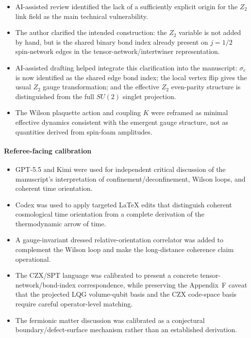 \documentclass[preprint]{SciPost}
\theoremstyle{plain} %
\begin{document}
\begin{itemize}
\item AI-assisted review identified the lack of a sufficiently explicit origin for the $Z_2$ link field as the main technical vulnerability.
\item The author clarified the intended construction: the $Z_2$ variable is not added by hand, but is the shared binary bond index already present on $j=1/2$ spin-network edges in the tensor-network/intertwiner representation.
\item AI-assisted drafting helped integrate this clarification into the manuscript: $\sigma_e$ is now identified as the shared edge bond index; the local vertex flip gives the usual $Z_2$ gauge transformation; and the effective $Z_2$ even-parity structure is distinguished from the full $SU(2)$ singlet projection.
\item The Wilson plaquette action and coupling $K$ were reframed as minimal effective dynamics consistent with the emergent gauge structure, not as quantities derived from spin-foam amplitudes.
\end{itemize}

\paragraph{Referee-facing calibration}

\begin{itemize}
\item GPT-5.5 and Kimi were used for independent critical discussion of the manuscript's interpretation of confinement/deconfinement, Wilson loops, and coherent time orientation.
\item Codex was used to apply targeted \LaTeX{} edits that distinguish coherent cosmological time orientation from a complete derivation of the thermodynamic arrow of time.
\item A gauge-invariant dressed relative-orientation correlator was added to complement the Wilson loop and make the long-distance coherence claim operational.
\item The CZX/SPT language was calibrated to present a concrete tensor-network/bond-index correspondence, while preserving the Appendix~F caveat that the projected LQG volume-qubit basis and the CZX code-space basis require careful operator-level matching.
\item The fermionic matter discussion was calibrated as a conjectural boundary/defect-surface mechanism rather than an established derivation.
\end{itemize}
\end{document}
